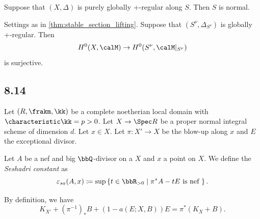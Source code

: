     \begin{proposition}\label{prop:normality_of_purely_globally_plus_regular_center}
        Suppose that \((X,\Delta)\) is purely globally +-regular along \(S\).
        Then \(S\) is normal.
    \end{proposition}

    \begin{proposition}
        Settings as in \cref{thm:stable_section_lifting}.
        Suppose that \((S^\nu,\Delta_{S^\nu})\) is globally +-regular.
        Then 
        \[ H^0(X,\calM) \to H^0(S^\nu,\calM|_{S^\nu})\]
        is surjective.
    \end{proposition}

\subsection{8.14}

    Let \((R,\frakm,\kk)\) be a complete noetherian local domain with \(\characteristic \kk = p>0\).
    Let \(X \to \Spec R\) be a proper normal integral scheme of dimension \(d\).
    Let \(x \in X\).
    Let \(\pi: X' \to X\) be the blow-up along \(x\) and \(E\) the exceptional divisor.

    \begin{definition}\label{def:seshadri_constant}
        Let \(A\) be a nef and big \(\bbQ\)-divisor on a \(X\) and \(x\) a point on \(X\).
        We define the \emph{Seshadri constant} as 
        \[ \varepsilon_{sa}(A,x) \coloneqq \sup \left\{ t \in \bbR_{>0} \mid \pi^*A - tE \text{ is nef } \right\}. \]
    \end{definition}

    By definition, we have 
    \[ K_{X'} + (\pi^{-1})_*B + (1-a(E;X,B))E = \pi^*(K_X + B). \]

